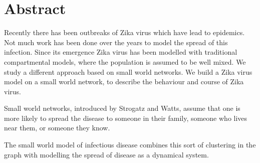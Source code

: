 
\chapter*{Abstract} 
Recently there has been outbreaks of Zika virus which have lead to epidemics. Not much work has been done over the years to model the spread of this infection.
Since its emergence Zika virus has been modelled with traditional compartmental models, where the population is assumed to be well mixed.
We study a different approach based on small world networks. We build a Zika virus model on a small world network, to describe the behaviour and course of Zika virus.


Small world networks, introduced by Strogatz and Watts,
assume that one is more likely to spread the disease to someone in their family, someone who lives near them, or someone they know.

The small world
model of infectious disease combines this sort of clustering in the graph with  modelling the spread of disease as a dynamical system.





